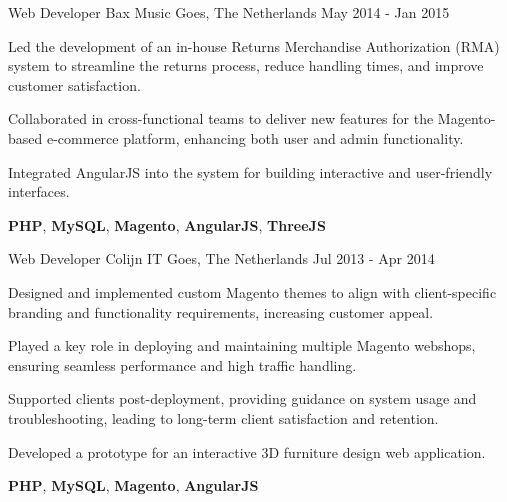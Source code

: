 \begin{cventries}
  \cventry
    {Web Developer} %
    {Bax Music} %
    {Goes, The Netherlands} %
    {May 2014 - Jan 2015} %
    {
      \begin{cvitems} %
        \item {Led the development of an in-house Returns Merchandise Authorization (RMA) system to streamline the returns process, reduce handling times, and improve customer satisfaction.}
        \item {Collaborated in cross-functional teams to deliver new features for the Magento-based e-commerce platform, enhancing both user and admin functionality.}
        \item {Integrated AngularJS into the system for building interactive and user-friendly interfaces.}
      \end{cvitems}
    }
    {\textbf{PHP}, \textbf{MySQL}, \textbf{Magento}, \textbf{AngularJS}, \textbf{ThreeJS}}

  \cventry
    {Web Developer} %
    {Colijn IT} %
    {Goes, The Netherlands} %
    {Jul 2013 - Apr 2014} %
    {
      \begin{cvitems} %
        \item {Designed and implemented custom Magento themes to align with client-specific branding and functionality requirements, increasing customer appeal.}
        \item {Played a key role in deploying and maintaining multiple Magento webshops, ensuring seamless performance and high traffic handling.  }
        \item {Supported clients post-deployment, providing guidance on system usage and troubleshooting, leading to long-term client satisfaction and retention.}
        \item {Developed a prototype for an interactive 3D furniture design web application.}
      \end{cvitems}
    }
    {\textbf{PHP}, \textbf{MySQL}, \textbf{Magento}, \textbf{AngularJS}}
\end{cventries}

